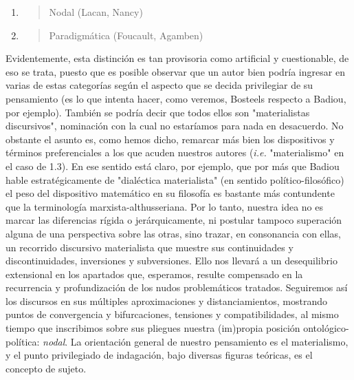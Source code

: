\begin{enumerate}
\begin{enumerate}
    \begin{enumerate}
    \def\labelenumiii{\arabic{enumiii}.}
    \setcounter{enumiii}{1}
    \item
      \begin{quote}
      Nodal (Lacan, Nancy)
      \end{quote}
    \item
      \begin{quote}
      Paradigmática (Foucault, Agamben)
      \end{quote}
    \end{enumerate}
  \end{enumerate}
\end{enumerate}

Evidentemente, esta distinción es tan provisoria como artificial y
cuestionable, de eso se trata, puesto que es posible observar que un
autor bien podría ingresar en varias de estas categorías según el
aspecto que se decida privilegiar de su pensamiento (es lo que intenta
hacer, como veremos, Bosteels respecto a Badiou, por ejemplo). También
se podría decir que todos ellos son "materialistas discursivos",
nominación con la cual no estaríamos para nada en desacuerdo. No
obstante el asunto es, como hemos dicho, remarcar más bien los
dispositivos y términos preferenciales a los que acuden nuestros autores
(\emph{i.e.} "materialismo" en el caso de 1.3). En ese sentido está
claro, por ejemplo, que por más que Badiou hable estratégicamente de
"dialéctica materialista" (en sentido político-filosófico) el peso del
dispositivo matemático en su filosofía es bastante más contundente que
la terminología marxista-althusseriana. Por lo tanto, nuestra idea no es
marcar las diferencias rígida o jerárquicamente, ni postular tampoco
superación alguna de una perspectiva sobre las otras, sino trazar, en
consonancia con ellas, un recorrido discursivo materialista que muestre
sus continuidades y discontinuidades, inversiones y subversiones. Ello
nos llevará a un desequilibrio extensional en los apartados que,
esperamos, resulte compensado en la recurrencia y profundización de los
nudos problemáticos tratados. Seguiremos así los discursos en sus
múltiples aproximaciones y distanciamientos, mostrando puntos de
convergencia y bifurcaciones, tensiones y compatibilidades, al mismo
tiempo que inscribimos sobre sus pliegues nuestra (im)propia posición
ontológico-política: \emph{nodal}. La orientación general de nuestro
pensamiento es el materialismo, y el punto privilegiado de indagación,
bajo diversas figuras teóricas, es el concepto de sujeto.

